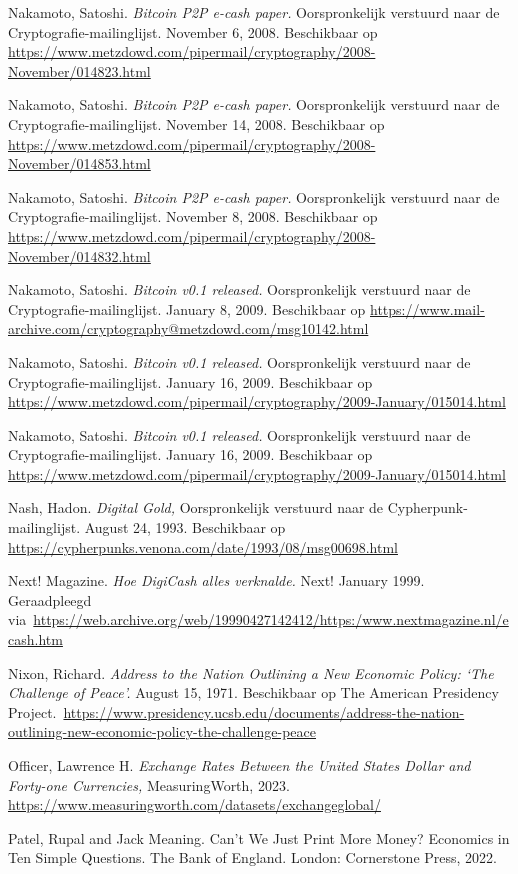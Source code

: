 \documentclass[
  a5paper,
  smalldemyvopaper,11pt,twoside,onecolumn,openright,extrafontsizes,
hidelinks]{memoir}
\begin{document}
{Nakamoto, Satoshi. \emph{Bitcoin P2P e-cash paper.} Oorspronkelijk
verstuurd naar de Cryptografie-mailinglijst. November 6, 2008.
Beschikbaar op
\url{https://www.metzdowd.com/pipermail/cryptography/2008-November/014823.html}

Nakamoto, Satoshi. \emph{Bitcoin P2P e-cash paper.} Oorspronkelijk
verstuurd naar de Cryptografie-mailinglijst. November 14, 2008.
Beschikbaar op
\url{https://www.metzdowd.com/pipermail/cryptography/2008-November/014853.html}

Nakamoto, Satoshi. \emph{Bitcoin P2P e-cash paper.} Oorspronkelijk
verstuurd naar de Cryptografie-mailinglijst. November 8, 2008.
Beschikbaar op
\url{https://www.metzdowd.com/pipermail/cryptography/2008-November/014832.html}

Nakamoto, Satoshi. \emph{Bitcoin v0.1 released.} Oorspronkelijk
verstuurd naar de Cryptografie-mailinglijst. January 8, 2009.
Beschikbaar op
\url{https://www.mail-archive.com/cryptography@metzdowd.com/msg10142.html}

Nakamoto, Satoshi. \emph{Bitcoin v0.1 released.} Oorspronkelijk
verstuurd naar de Cryptografie-mailinglijst. January 16, 2009.
Beschikbaar op
\url{https://www.metzdowd.com/pipermail/cryptography/2009-January/015014.html}

Nakamoto, Satoshi. \emph{Bitcoin v0.1 released.} Oorspronkelijk
verstuurd naar de Cryptografie-mailinglijst. January 16, 2009.
Beschikbaar op
\url{https://www.metzdowd.com/pipermail/cryptography/2009-January/015014.html}

Nash, Hadon. \emph{Digital Gold,} Oorspronkelijk verstuurd naar de
Cypherpunk-mailinglijst. August 24, 1993. Beschikbaar op
\url{https://cypherpunks.venona.com/date/1993/08/msg00698.html}

Next! Magazine. \emph{Hoe DigiCash alles verknalde.} Next! January 1999.
Geraadpleegd
via~\url{https://web.archive.org/web/19990427142412/https:/www.nextmagazine.nl/ecash.htm}

Nixon, Richard. \emph{Address to the Nation Outlining a New Economic
Policy: `The Challenge of Peace'.} August 15, 1971. Beschikbaar op The
American Presidency
Project.~\url{https://www.presidency.ucsb.edu/documents/address-the-nation-outlining-new-economic-policy-the-challenge-peace}

Officer, Lawrence H. \emph{Exchange Rates Between the United States
Dollar and Forty-one Currencies,} MeasuringWorth, 2023.
\url{https://www.measuringworth.com/datasets/exchangeglobal/}

Patel, Rupal and Jack Meaning. Can't We Just Print More Money? Economics
in Ten Simple Questions. The Bank of England. London: Cornerstone Press,
2022.

}
\end{document}
